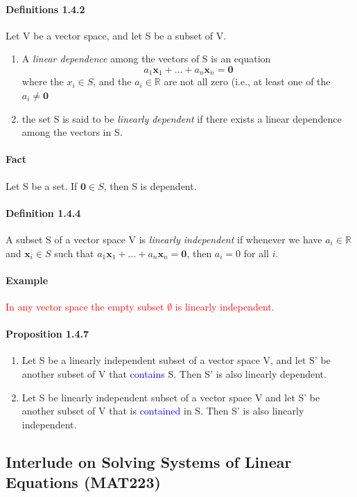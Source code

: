 \documentclass[11pt]{article}
\newcommand{\ti}[1]{\textit{#1}}
\newcommand{\tb}[1]{\textbf{#1}}
\newcommand{\real}[0]{\mathbb{R}}
\newcommand{\vx}[0]{\tb{x}}
\newcommand{\vo}[0]{\tb{0}}
\begin{document}
	\paragraph{Definitions 1.4.2} Let V be a vector space, and let S be a subset of V.
	\begin{enumerate}
		\item A \ti{linear dependence} among the vectors of S is an equation
		$$a_1\vx_1 + \hdots + a_n\vx_n = \vo$$
		where the $x_i \in S$, and the $a_i \in \real$ are not all zero (i.e., at least one of the $a_i \neq \vo$
		\item the set S is said to be \ti{linearly dependent} if there exists a linear dependence among the vectors in S.
	\end{enumerate}
	
	\paragraph{Fact}
	Let S be a set. If $\vo \in S$, then S is dependent. 
	
	\paragraph{Definition 1.4.4} A subset S of a vector space V is \ti{linearly independent} if whenever we have $a_i \in \real$ and $\vx_i \in S$ such that $a_1\vx_1 + \hdots + a_n\vx_n = \vo$, then $a_i = 0$ for all $i$.
	
	\paragraph{Example}
	\textcolor{red}{In any vector space the empty subset $\emptyset$ is linearly independent.}
	\paragraph{Proposition 1.4.7}
	\begin{enumerate}
		\item Let S be a linearly independent subset of a vector space V, and let S' be another subset of V that \textcolor{blue}{contains} S. Then S' is also linearly dependent.
		\item Let S be linearly independent subset of a vector space V and let S' be another subset of V that is \textcolor{blue}{contained} in S. Then S' is also linearly independent.
	\end{enumerate}
	
	\subsection{Interlude on Solving Systems of Linear Equations (MAT223)}
\end{document}
